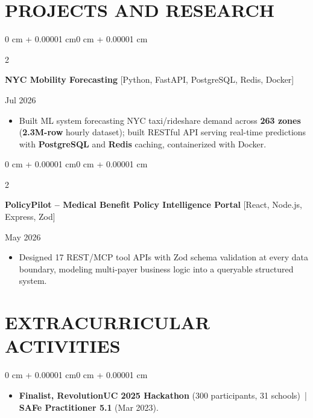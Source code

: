\documentclass[10pt, letterpaper]{article}
\newenvironment{highlights}{
    \begin{itemize}[
        topsep=0.10 cm,
        parsep=0.06 cm,
        partopsep=0pt,
        itemsep=0.06 cm,
        leftmargin=12pt
    ]
}{
    \end{itemize}
}
\newenvironment{onecolentry}{
    \begin{adjustwidth}{0 cm + 0.00001 cm}{0 cm + 0.00001 cm}
}{
    \end{adjustwidth}
}
\newenvironment{twocolentry}[2][]{
    \onecolentry
    \def\secondColumn{#2}
    \setcolumnwidth{\fill, 4.5 cm}
    \begin{paracol}{2}
}{
    \switchcolumn \raggedleft \secondColumn
    \end{paracol}
    \endonecolentry
}
\begin{document}
\section{PROJECTS AND RESEARCH}
\begin{twocolentry}{Jul 2026}
\textbf{NYC Mobility Forecasting} [Python, FastAPI, PostgreSQL, Redis, Docker]
\end{twocolentry}
\begin{highlights}
  \item Built ML system forecasting NYC taxi/rideshare demand across \textbf{263 zones} (\textbf{2.3M-row} hourly dataset); built RESTful API serving real-time predictions with \textbf{PostgreSQL} and \textbf{Redis} caching, containerized with Docker.
\end{highlights}

\vspace{0.12 cm}

\begin{twocolentry}{May 2026}
\textbf{PolicyPilot -- Medical Benefit Policy Intelligence Portal} [React, Node.js, Express, Zod]
\end{twocolentry}
\begin{highlights}
  \item Designed 17 REST/MCP tool APIs with Zod schema validation at every data boundary, modeling multi-payer business logic into a queryable structured system.
\end{highlights}

\section{EXTRACURRICULAR ACTIVITIES}
\begin{onecolentry}
\begin{highlights}
  \item \textbf{Finalist, RevolutionUC 2025 Hackathon} (300 participants, 31 schools) \,|\, \textbf{SAFe Practitioner 5.1} (Mar 2023).
\end{highlights}
\end{onecolentry}
\end{document}
